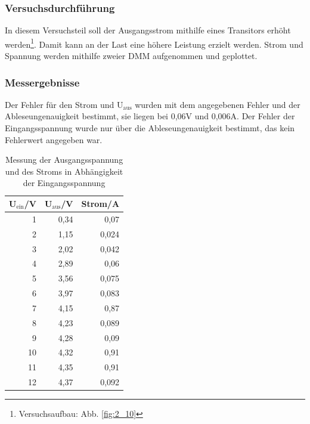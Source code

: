 \documentclass[12pt,a4paper]{article}
\begin{document}
\subsubsection{Versuchsdurchführung}
In diesem Versuchsteil soll der Ausgangsstrom mithilfe eines Transitors erhöht werden\footnote{Versuchsaufbau: Abb. \ref{fig:2_10}}. Damit kann an der Last eine höhere Leistung erzielt werden. Strom und Spannung werden mithilfe zweier DMM aufgenommen und geplottet.
\subsubsection{Messergebnisse}

Der Fehler für den Strom und U$_\text{aus}$ wurden mit dem angegebenen Fehler und der Ableseungenauigkeit bestimmt, sie liegen bei 0,06V und 0,006A. Der Fehler der Eingangsspannung wurde nur über die Ableseungenauigkeit bestimmt, das kein Fehlerwert angegeben war.

\begin{table}[H]
\caption{Messung der Ausgangsspannung und des Stroms in Abhängigkeit der Eingangsspannung}
\begin{center}
\begin{tabular}{|r|r|r|}
\hline
\multicolumn{1}{|l|}{U$_\text{ein}$/V} & \multicolumn{1}{l|}{U$_\text{aus}$/V} & \multicolumn{1}{l|}{Strom/A} \\ \hline
1 & 0,34 & 0,07 \\ \hline
2 & 1,15 & 0,024 \\ \hline
3 & 2,02 & 0,042 \\ \hline
4 & 2,89 & 0,06 \\ \hline
5 & 3,56 & 0,075 \\ \hline
6 & 3,97 & 0,083 \\ \hline
7 & 4,15 & 0,87 \\ \hline
8 & 4,23 & 0,089 \\ \hline
9 & 4,28 & 0,09 \\ \hline
10 & 4,32 & 0,91 \\ \hline
11 & 4,35 & 0,91 \\ \hline
12 & 4,37 & 0,092 \\ \hline
\end{tabular}
\end{center}
\label{tab:3_3_w}
\end{table}
\end{document}
